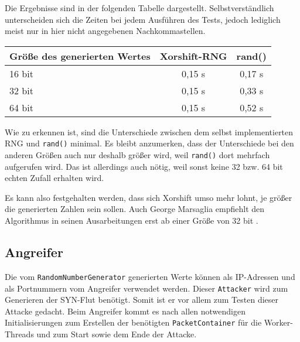 \documentclass[../review_3.tex]{subfiles}
\begin{document}
Die Ergebnisse sind in der folgenden Tabelle dargestellt. Selbstverständlich unterscheiden sich die Zeiten bei jedem Ausführen des Tests, jedoch lediglich meist nur in hier nicht angegebenen Nachkommastellen.
\begin{longtable}[H]{p{}c c}
    \toprule
    \textbf{Größe des generierten Wertes} & \textbf{Xorshift-RNG} & \textbf{rand()} \\ \toprule \endhead
    16 bit                                & 0,15 s                & 0,17 s          \\
    32 bit                                & 0,15 s                & 0,33 s          \\
    64 bit                                & 0,15 s                & 0,52 s          \\
    \bottomrule
\end{longtable}
Wie zu erkennen ist, sind die Unterschiede zwischen dem selbst implementierten RNG und \texttt{rand()} minimal. Es bleibt anzumerken, dass der Unterschiede bei den anderen Größen auch nur deshalb größer wird, weil \texttt{rand()} dort mehrfach aufgerufen wird. Das ist allerdings auch nötig, weil sonst keine 32 bzw. 64 bit echten Zufall erhalten wird.

Es kann also festgehalten werden, dass sich Xorshift umso mehr lohnt, je größer die generierten Zahlen sein sollen. Auch George Marsaglia empfiehlt den Algorithmus in seinen Ausarbeitungen erst ab einer Größe von 32 bit \cite{xorshift}.

\subsection{Angreifer}
%
%
Die vom \texttt{RandomNumberGenerator} generierten Werte können als IP-Adressen und als Portnummern vom Angreifer verwendet werden. Dieser \texttt{Attacker} wird zum Generieren der SYN-Flut benötigt. Somit ist er vor allem zum Testen dieser Attacke gedacht. Beim Angreifer kommt es nach allen notwendigen Initialisierungen zum Erstellen der benötigten \texttt{PacketContainer} für die Worker-Threads und zum Start sowie dem Ende der Attacke.
\end{document}
